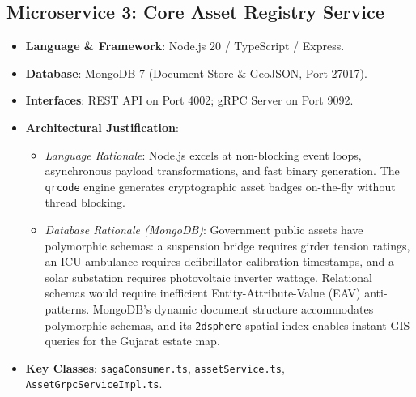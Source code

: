 \documentclass[11pt,a4paper]{article}
\begin{document}
\subsection{Microservice 3: Core Asset Registry Service}
\begin{itemize}[leftmargin=1.5em]
    \item \textbf{Language \& Framework}: Node.js 20 / TypeScript / Express.
    \item \textbf{Database}: MongoDB 7 (Document Store \& GeoJSON, Port 27017).
    \item \textbf{Interfaces}: REST API on Port 4002; gRPC Server on Port 9092.
    \item \textbf{Architectural Justification}:
    \begin{itemize}
        \item \textit{Language Rationale}: Node.js excels at non-blocking event loops, asynchronous payload transformations, and fast binary generation. The \texttt{qrcode} engine generates cryptographic asset badges on-the-fly without thread blocking.
        \item \textit{Database Rationale (MongoDB)}: Government public assets have polymorphic schemas: a suspension bridge requires girder tension ratings, an ICU ambulance requires defibrillator calibration timestamps, and a solar substation requires photovoltaic inverter wattage. Relational schemas would require inefficient Entity-Attribute-Value (EAV) anti-patterns. MongoDB's dynamic document structure accommodates polymorphic schemas, and its \texttt{2dsphere} spatial index enables instant GIS queries for the Gujarat estate map.
    \end{itemize}
    \item \textbf{Key Classes}: \texttt{sagaConsumer.ts}, \texttt{assetService.ts}, \texttt{AssetGrpcServiceImpl.ts}.
\end{itemize}
\end{document}
